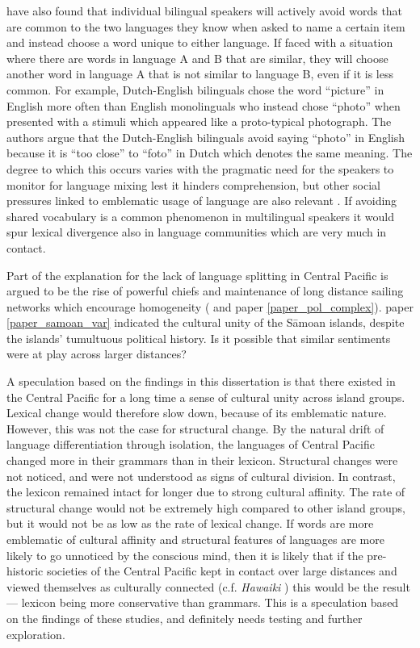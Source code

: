 \documentclass[draft,10pt]{article} %
\begin{document}
\cite{ellison2017language} have also found that individual bilingual speakers will actively avoid words that are common to the two languages they know when asked to name a certain item and instead choose a word unique to either language. If faced with a situation where there are words in language A and B that are similar, they will choose another word in language A that is not similar to language B, even if it is less common. For example, Dutch-English bilinguals chose the word ``picture'' in English more often than English monolinguals who instead chose ``photo'' when presented with a stimuli which appeared like a proto-typical photograph. The authors argue that the Dutch-English bilinguals avoid saying ``photo'' in English because it is ``too close'' to ``foto'' in Dutch which denotes the same meaning. The degree to which this occurs varies with the pragmatic need for the speakers to monitor for language mixing lest it hinders comprehension, but other social pressures linked to emblematic usage of language are also relevant  \cite[277]{ellison2017language}. If avoiding shared vocabulary is a common phenomenon in multilingual speakers it would spur lexical divergence also in language communities which are very much in contact.

Part of the explanation for the lack of language splitting in Central Pacific is argued to be the rise of powerful chiefs and maintenance of long distance sailing networks which encourage homogeneity (\citet{pawley2007} and paper \ref{paper_pol_complex}). paper \ref{paper_samoan_var} indicated the cultural unity of the S\={a}moan islands, despite the islands' tumultuous political history. Is it possible that similar sentiments were at play across larger distances? 

A speculation based on the findings in this dissertation is that there existed in the Central Pacific for a long time a sense of cultural unity across island groups. Lexical change would therefore slow down, because of its emblematic nature. However, this was not the case for structural change. By the natural drift of language differentiation through isolation, the languages of Central Pacific changed more in their grammars than in their lexicon. Structural changes were not noticed, and were not understood as signs of cultural division. In contrast, the lexicon remained intact for longer due to strong cultural affinity. The rate of structural change would not be extremely high compared to other island groups, but it would not be as low as the rate of lexical change. If words are more emblematic of cultural affinity and structural features of languages are more likely to go unnoticed by the conscious mind, then it is likely that if the pre-historic societies of the Central Pacific kept in contact over large distances and viewed themselves as culturally connected (c.f. \emph{Hawaiki} \citep{kirchgreen2001}) this would be the result --- lexicon being more conservative than grammars. This is a speculation based on the findings of these studies, and definitely needs testing and further exploration. 
\end{document}
